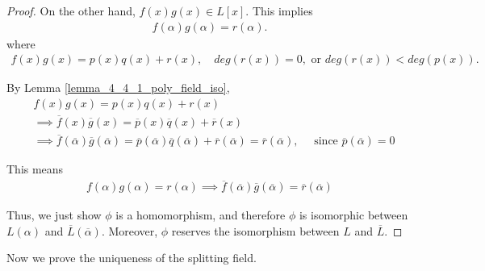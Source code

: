 \documentclass[utf8]{ctexbook}
\theoremstyle{definition}
\begin{document}
\begin{proof}
On the other hand, $f(x) g(x)  \in L[x]$. This implies 
\begin{align*}
f(\alpha) g(\alpha) = r(\alpha) .
\end{align*}
where
\begin{align*}
f(x) g(x) = p(x) q(x) + r(x), \quad deg(r(x)) = 0, \mbox{ or } deg(r(x)) < deg(p(x)) .
\end{align*}

By Lemma \ref{lemma_4_4_1_poly_field_iso}, 
\begin{align*}
& f(x) g(x) = p(x) q(x) + r(x) \\
& \implies \overline{f} (x) \overline{g} (x) = \overline{p} (x) \overline{q} (x) + \overline{r} (x) \\
& \implies \overline{f}(\overline{\alpha}) \overline{g} (\overline{\alpha}) = \overline{p} ( \overline{\alpha} ) \overline{q} (\overline{\alpha}) + \overline{r} ( \overline{\alpha} ) =\overline{r} ( \overline{\alpha} )  , \quad \mbox{ since } \overline{p} (\overline{\alpha} ) = 0
\end{align*}

This means
\begin{align*}
f(\alpha) g(\alpha) = r(\alpha) \implies \overline{f}(\overline{\alpha}) \overline{g} (\overline{\alpha}) = \overline{r} ( \overline{\alpha} )
\end{align*}

Thus, we just show $\phi$ is a homomorphism, and therefore $\phi$ is isomorphic between $L(\alpha) $ and $\overline{L} (\overline{\alpha})$. Moreover, $\phi$ reserves the isomorphism between $L$ and $\overline{L}$.

\end{proof}

Now we prove the uniqueness of the splitting field.
\end{document}
